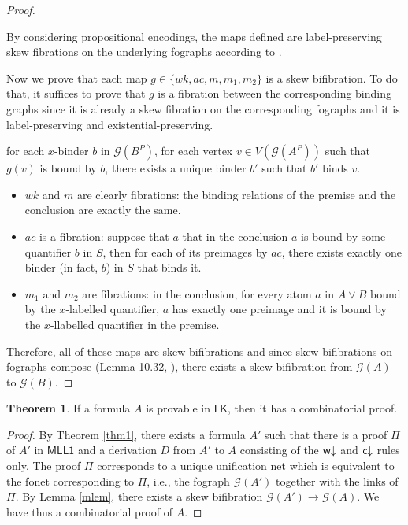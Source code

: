 \documentclass[conference,twosided,10pt]{IEEEtran}
\theoremstyle{definition}
\newtheorem{theorem_}[thm]{Theorem}
\newcommand*{\LK}{\mathsf{LK}}
\newcommand*{\FOMLL}{\mathsf{MLL1}}
\newcommand{\Gr}{\mathcal{G}}
\newcommand{\PE}[1]{#1^P}
\begin{document}
\begin{proof}
\begin{itemize}
\end{itemize}

By considering propositional encodings, the maps defined are label-preserving skew fibrations on the underlying fographs according to \cite{Strassburger 2007}.

Now we prove that each map $g \in \{wk, ac, m, m_1, m_2 \}$ is a skew bifibration. To do that, it suffices to prove that $g$ is a fibration between the corresponding binding graphs since it is already a skew fibration on the corresponding fographs and it is label-preserving and existential-preserving.
\begin{center}
for each $x$-binder $b$ in $\Gr(\PE{B})$, for each vertex $v \in V(\Gr(\PE{A}))$
such that $g(v)$ is bound by $b$, there exists a unique binder $b'$ such
that $b'$ binds $v$.
\end{center}

\begin{itemize}
  \item $wk$ and $m$ are clearly fibrations: the binding relations of the premise and the conclusion are exactly the same.
  \item $ac$ is a fibration: suppose that $a$ that in the conclusion $a$ is bound by some quantifier $b$ in $S$, then for each of its preimages by $ac$, there exists exactly one binder (in fact, $b$) in $S$ that binds it.
  \item $m_1$ and $m_2$ are fibrations: in the conclusion, for every atom $a$ in $A \vee B$ bound by the $x$-labelled quantifier, $a$ has exactly one preimage and it is bound by the $x$-llabelled quantifier in the premise.
\end{itemize}

  Therefore, all of these maps are skew bifibrations and since skew bifibrations
on fographs compose (Lemma 10.32, \cite{Hughes 2019}), there exists a skew
bifibration from $\Gr(A)$ to $\Gr(B)$.

\end{proof}

\begin{theorem_}
If a formula $A$ is provable in $\LK$, then it has a combinatorial proof.
\end{theorem_}

\begin{proof}
By Theorem \ref{thm1}, there exists a formula $A'$ such that there is a proof
$\Pi$ of $A'$ in $\FOMLL$ and a derivation $D$ from $A'$ to $A$ consisting of
the ${\mathsf w}{\downarrow}$ and ${\mathsf c}{\downarrow}$ rules only. The proof $\Pi$ corresponds to a unique
unification net which is equivalent to the fonet corresponding to $\Pi$, i.e.,
the fograph $\Gr(A')$ together with the links of $\Pi$. By Lemma \ref{mlem}, 
there exists a skew bifibration $\Gr(A') \rightarrow \Gr(A)$. We have thus a
combinatorial proof of $A$.

\end{proof}
\end{document}
